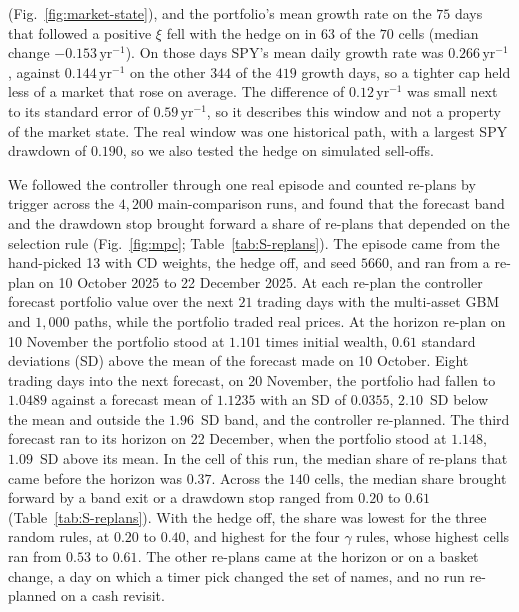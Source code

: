 (Fig.~\ref{fig:market-state}), and the portfolio's mean growth rate on the $75$ days that followed a positive $\xi$
fell with the hedge on in $63$ of the $70$ cells (median change $-0.153\,\mathrm{yr}^{-1}$). On those days SPY's mean
daily growth rate was $0.266\,\mathrm{yr}^{-1}$, against $0.144\,\mathrm{yr}^{-1}$ on the other $344$ of the $419$
growth days, so a tighter cap held less of a market that rose on average. The difference of $0.12\,\mathrm{yr}^{-1}$
was small next to its standard error of $0.59\,\mathrm{yr}^{-1}$, so it describes this window and not a property of
the market state.
The real window was one historical path, with a largest SPY drawdown of $0.190$, so we also tested the hedge on
simulated sell-offs.

We followed the controller through one real episode and counted re-plans by trigger across the $4{,}200$
main-comparison runs, and found that the forecast band and the drawdown stop brought forward a share of re-plans
that depended on the selection rule (Fig.~\ref{fig:mpc}; Table~\ref{tab:S-replans}). The episode came from the hand-picked 13 with CD weights,
the hedge off, and seed $5660$, and ran from a re-plan on 10 October 2025 to 22 December 2025. At each re-plan the
controller forecast portfolio value over the next $21$ trading days with the multi-asset GBM and $1{,}000$ paths,
while the portfolio traded real prices. At the horizon re-plan on 10 November the portfolio stood at $1.101$ times
initial wealth, $0.61$ standard deviations (SD) above the mean of the forecast made on 10 October. Eight trading days
into the next forecast, on 20 November, the portfolio had fallen to $1.0489$ against a forecast mean of $1.1235$ with
an SD of $0.0355$, $2.10$~SD below the mean and outside the $1.96$~SD band, and the controller re-planned. The third
forecast ran to its horizon on 22 December, when the portfolio stood at $1.148$, $1.09$~SD above its mean.
In the cell of this run, the median share of re-plans that came before the horizon was $0.37$. Across the $140$
cells, the median share brought forward by a band exit or a drawdown stop ranged from $0.20$ to $0.61$
(Table~\ref{tab:S-replans}). With the hedge off, the share was lowest for the three random rules, at $0.20$ to
$0.40$, and highest for the four $\gamma$ rules, whose highest cells ran from $0.53$ to $0.61$. The other re-plans
came at the horizon or on a basket change, a day on which a timer pick changed the set of names, and no run
re-planned on a cash revisit.

